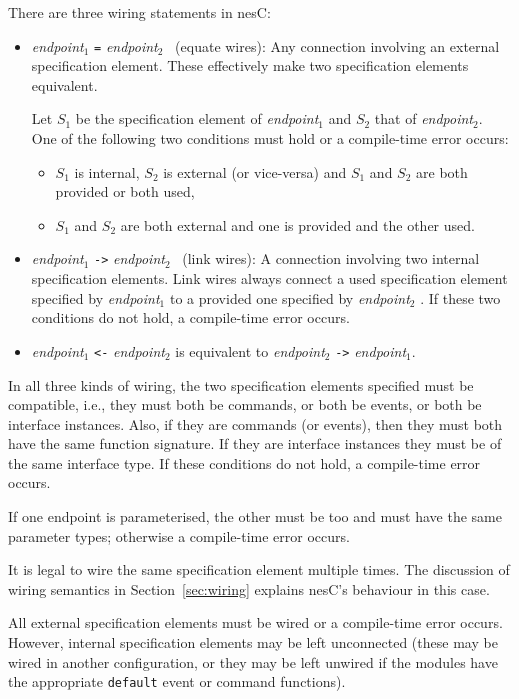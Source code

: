 \documentclass[11pt]{article}
\newcommand{\kw}[1]{{\tt #1}}
\newcommand{\code}[1]{{\tt #1}}
\newcommand{\nesc}{nesC\xspace}
\begin{document}
There are three wiring statements in \nesc:
\begin{itemize}
\item \emph{endpoint}$_1$ \code{=} \emph{endpoint}$_2$ \ (equate wires):
Any connection involving an external specification element. These
effectively make two specification elements equivalent.

Let $S_1$ be the specification element of \emph{endpoint}$_1$ and $S_2$
that of \emph{endpoint}$_2$. One of the following two conditions must hold
or a compile-time error occurs:
\begin{itemize}
\item $S_1$ is internal, $S_2$ is external (or vice-versa) and $S_1$ and
$S_2$ are both provided or both used,
\item $S_1$ and $S_2$ are both external and one is provided and the other used.
\end{itemize}

\item \emph{endpoint}$_1$ \code{->} \emph{endpoint}$_2$ \ (link wires): A
connection involving two internal specification elements. Link wires always
connect a used specification element specified by \emph{endpoint}$_1$ to a
provided one specified by \emph{endpoint}$_2$ . If these two conditions do
not hold, a compile-time error occurs.

\item \emph{endpoint}$_1$ \code{<-} \emph{endpoint}$_2$ is equivalent to
\emph{endpoint}$_2$ \code{->} \emph{endpoint}$_1$.
\end{itemize}

In all three kinds of wiring, the two specification elements specified must
be compatible, i.e., they must both be commands, or both be events, or both
be interface instances. Also, if they are commands (or events), then they
must both have the same function signature. If they are interface instances
they must be of the same interface type. If these conditions do not hold,
a compile-time error occurs.

If one endpoint is parameterised, the other must be too and must have the
same parameter types; otherwise a compile-time error occurs.

It is legal to wire the same specification element multiple times. The
discussion of wiring semantics in Section~\ref{sec:wiring} explains \nesc's
behaviour in this case.

All external specification elements must be wired or a compile-time error
occurs. However, internal specification elements may be left unconnected
(these may be wired in another configuration, or they may be left unwired
if the modules have the appropriate \kw{default} event or command
functions).
\end{document}

